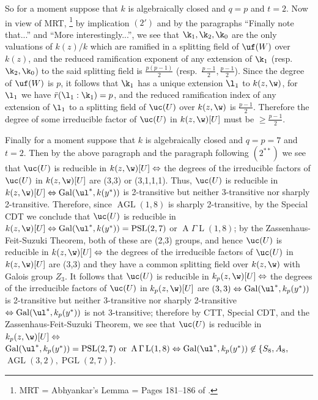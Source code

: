 So for a moment suppose that $k$ is algebraically closed 
and $q=p$ and $t=2$. 
Now in view of MRT,
\footnote{MRT = Abhyankar's Lemma =  Pages 181--186 of 
\cite{A5}.}
by implication $(2')$ and by the paragraphs ``Finally note 
that...'' and
``More interestingly...'', we see that $\k_1,\k_2,\k_0$ 
are the only 
valuations of $k(z)/k$ which are ramified in a splitting 
field
of $\uf(W)$ over $k(z)$, and the reduced ramification 
exponent of any
extension of $\k_1$ (resp.\ $\k_2,\k_0$) to the said 
splitting field is
$\frac{p(p-1)}{2}$ (resp.\ $\frac{p-1}{2},\frac{p-1}{2}$). 
Since the degree of 
$\uf(W)$ is $p$, it follows that $\k_1$ has a unique 
extension
$\l_1$ to $k(z,\w)$, for $\l_1$ we have $\bar 
r(\l_1:\k_1)=p$, and the
reduced ramification index of any extension of $\l_1$ to a 
splitting field
of $\uc(U)$ over $k(z,\w)$ is $\frac{p-1}{2}$.
Therefore the degree of some irreducible factor of 
$\uc(U)$ in
$k(z,\w)[U]$ must be $\ge \frac{p-1}{2}$.  

Finally for a moment suppose that $k$ is algebraically 
closed and
$q=p=7$ and $t=2$. Then by the above paragraph and the 
paragraph following
$(2^{**})$ we see that $\uc(U)$ is reducible
in $k(z,\w)[U]\Leftrightarrow$ the degrees of the 
irreducible factors of
$\uc(U)$ in $k(z,\w)[U]$ are (3,3) or (3,1,1,1).
Thus, $\uc(U)$ is reducible in 
$k(z,\w)[U]\Leftrightarrow\operatorname{Gal}(\ul^*,k(y^*))$
is 2-transitive but neither 3-transitive nor sharply 
2-transitive.
Therefore, since $\operatorname{AGL}(1,8)$ is sharply 
2-transitive, by the Special CDT
we conclude that $\uc(U)$ is reducible in 
$k(z,\w)[U]\Leftrightarrow
\operatorname{Gal}(\ul^*,k(y^*))=\operatorname{PSL}(2,7)$
 or $\operatorname{A}\Gamma\operatorname{L}(1,8)$;
by the Zassenhaus-Feit-Suzuki Theorem, both of these are 
(2,3) groups,
and hence $\uc(U)$ is reducible in 
$k(z,\w)[U]\Leftrightarrow$ the degrees of 
the irreducible factors of $\uc(U)$ in $k(z,\w)[U]$ are 
(3,3) 
and they have a common splitting field over $k(z,\w)$ with 
Galois group $Z_3$.
It follows that $\uc(U)$ is reducible in 
$k_p(z,\w)[U]\Leftrightarrow$
the degrees of the irreducible factors of $\uc(U)$ in 
$k_p(z,\w)[U]$ are 
$(3,3)\Leftrightarrow\operatorname{Gal}(\ul^*,k_p(y^*))$ 
is 2-transitive but
neither 3-transitive nor sharply 2-transitive 
$\Leftrightarrow\operatorname{Gal}(\ul^*,k_p(y^*))$ is not 
3-transitive; therefore
by CTT, Special CDT, and the Zassenhaus-Feit-Suzuki
Theorem, we see that
$\uc(U)$ is reducible in $k_p(z,\w)[U]\Leftrightarrow$$%
\operatorname{Gal}(\ul^*,k_p(y^*))=\operatorname{PSL}(2,7)%
\text{ or }\operatorname{A}\Gamma\operatorname{L}(1,8)%
\Leftrightarrow
\operatorname{Gal}(\ul^*,k_p(y^*))\not\in\{S_8,A_8,$$%
\operatorname{AGL}(3,2),\operatorname{PGL}(2,7)\}$.

